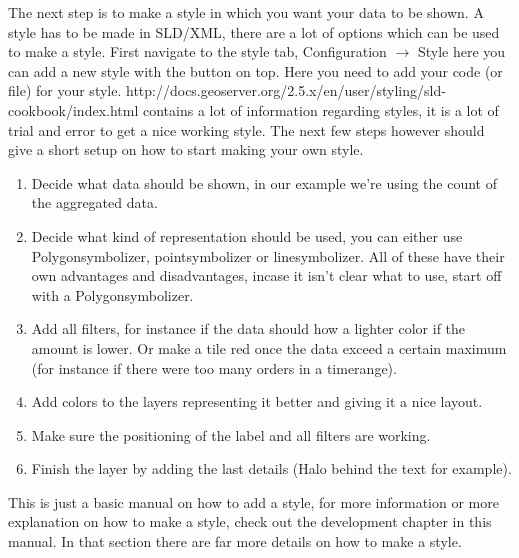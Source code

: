 The next step is to make a style in which you want your data to be shown. A style has to be made in SLD/XML, there are a lot of options which can be used to make a style. First navigate to the style tab, Configuration $\rightarrow$ Style here you can add a new style with the button on top. Here you need to add your code (or file) for your style.
\newline
\newline http://docs.geoserver.org/2.5.x/en/user/styling/sld-cookbook/index.html contains a lot of information regarding styles, it is a lot of trial and error to get a nice working style. The next few steps however should give a short setup on how to start making your own style.
\begin{enumerate}
	\item Decide what data should be shown, in our example we’re using the count of the aggregated data.
	\item Decide what kind of representation should be used, you can either use Polygonsymbolizer, pointsymbolizer or linesymbolizer. All of these have their own advantages and disadvantages, incase it isn't clear what to use, start off with a Polygonsymbolizer.
	\item Add all filters, for instance if the data should how a lighter color if the amount is lower. Or make a tile red once the data exceed a certain maximum (for instance if there were too many orders in a timerange).
	\item Add colors to the layers representing it better and giving it a nice layout.
	\item Make sure the positioning of the label and all filters are working.
	\item Finish the layer by adding the last details (Halo behind the text for example).
\end{enumerate}
	This is just a basic manual on how to add a style, for more information or more explanation on how to make a style, check out the development chapter in this manual. In that section there are far more details on how to make a style.